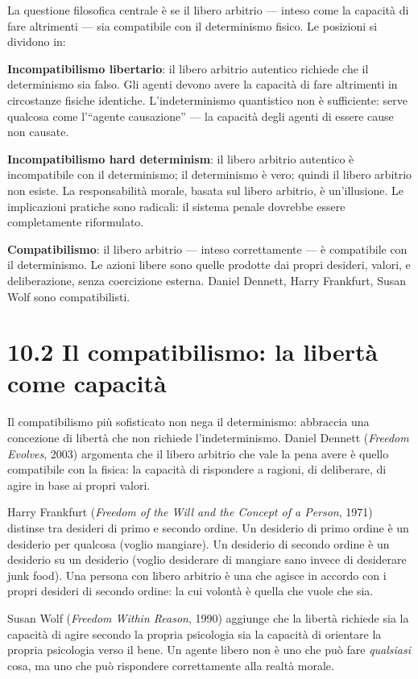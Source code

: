 \documentclass[11.5pt,a4paper,openany]{book}
\theoremstyle{remark}
\begin{document}
La questione filosofica centrale è se il libero arbitrio --- inteso come la capacità di fare altrimenti --- sia compatibile con il determinismo fisico. Le posizioni si dividono in:

\textbf{Incompatibilismo libertario}: il libero arbitrio autentico richiede che il determinismo sia falso. Gli agenti devono avere la capacità di fare altrimenti in circostanze fisiche identiche. L'indeterminismo quantistico non è sufficiente: serve qualcosa come l'``agente causazione'' --- la capacità degli agenti di essere cause non causate.

\textbf{Incompatibilismo hard determinism}: il libero arbitrio autentico è incompatibile con il determinismo; il determinismo è vero; quindi il libero arbitrio non esiste. La responsabilità morale, basata sul libero arbitrio, è un'illusione. Le implicazioni pratiche sono radicali: il sistema penale dovrebbe essere completamente riformulato.

\textbf{Compatibilismo}: il libero arbitrio --- inteso correttamente --- è compatibile con il determinismo. Le azioni libere sono quelle prodotte dai propri desideri, valori, e deliberazione, senza coercizione esterna. Daniel Dennett, Harry Frankfurt, Susan Wolf sono compatibilisti.

\section{10.2 Il compatibilismo: la libertà come capacità}

Il compatibilismo più sofisticato non nega il determinismo: abbraccia una concezione di libertà che non richiede l'indeterminismo. Daniel Dennett (\textit{Freedom Evolves}, 2003) argomenta che il libero arbitrio che vale la pena avere è quello compatibile con la fisica: la capacità di rispondere a ragioni, di deliberare, di agire in base ai propri valori.

Harry Frankfurt (\textit{Freedom of the Will and the Concept of a Person}, 1971) distinse tra desideri di primo e secondo ordine. Un desiderio di primo ordine è un desiderio per qualcosa (voglio mangiare). Un desiderio di secondo ordine è un desiderio su un desiderio (voglio desiderare di mangiare sano invece di desiderare junk food). Una persona con libero arbitrio è una che agisce in accordo con i propri desideri di secondo ordine: la cui volontà è quella che vuole che sia.

Susan Wolf (\textit{Freedom Within Reason}, 1990) aggiunge che la libertà richiede sia la capacità di agire secondo la propria psicologia sia la capacità di orientare la propria psicologia verso il bene. Un agente libero non è uno che può fare \textit{qualsiasi} cosa, ma uno che può rispondere correttamente alla realtà morale.
\end{document}
